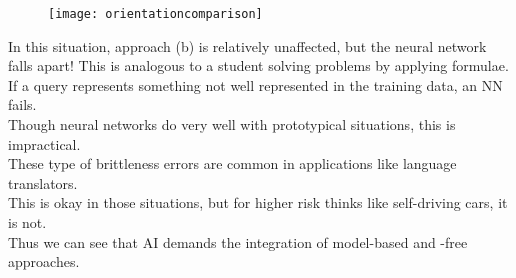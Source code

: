 \documentclass[../../lecture_notes.tex]{subfiles}
\begin{document}
\begin{center}\begin{figure}[H]
	\texttt{[image: orientationcomparison]}
\end{figure}\end{center}

\noindent In this situation, approach (b) is relatively unaffected, but the neural network falls apart!
This is analogous to a student solving problems by applying formulae.\\
If a query represents something not well represented in the training data, an NN fails.\\
Though neural networks do very well with prototypical situations, this is impractical.\\
	\indent These type of brittleness errors are common in applications like language translators.\\
	\indent This is okay in those situations, but for higher risk thinks like self-driving cars, it is not.\\
Thus we can see that AI demands the integration of model-based and -free approaches.
\end{document}
